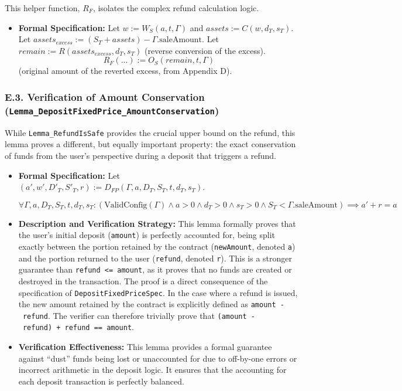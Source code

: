 \documentclass[
  english,
  onecolumn]{article}
\providecommand{\tightlist}{%
  \setlength{\itemsep}{0pt}\setlength{\parskip}{0pt}}
\begin{document}
This helper function, \(R_F\), isolates the complex refund calculation
logic.

\begin{itemize}
\tightlist
\item
  \textbf{Formal Specification:} Let \(w := W_S(a, t, \Gamma)\) and
  \(assets := C(w, d_T, s_T)\). Let
  \(assets_{excess} := (S_T + assets) - \Gamma.\text{saleAmount}\). Let
  \(remain := R(assets_{excess}, d_T, s_T)\) (reverse conversion of the
  excess). \[
  R_F(...) := O_S(remain, t, \Gamma)
  \] (original amount of the reverted excess, from Appendix D).
\end{itemize}

\subsubsection{\texorpdfstring{E.3. Verification of Amount Conservation
(\texttt{Lemma\_DepositFixedPrice\_AmountConservation})}{E.3. Verification of Amount Conservation (Lemma\_DepositFixedPrice\_AmountConservation)}}\label{e.3.-verification-of-amount-conservation-lemma_depositfixedprice_amountconservation}

While \texttt{Lemma\_RefundIsSafe} provides the crucial upper bound on
the refund, this lemma proves a different, but equally important
property: the exact conservation of funds from the user's perspective
during a deposit that triggers a refund.

\begin{itemize}
\item
  \textbf{Formal Specification:} Let
  \((a', w', D'_T, S'_T, r) := D_{FP}(\Gamma, a, D_T, S_T, t, d_T, s_T)\).

  \(\forall \Gamma, a, D_T, S_T, t, d_T, s_T : (\text{ValidConfig}(\Gamma) \land a > 0 \land d_T > 0 \land s_T > 0 \land S_T < \Gamma.\text{saleAmount}) \implies a' + r = a\)
\item
  \textbf{Description and Verification Strategy:} This lemma formally
  proves that the user's initial deposit (\texttt{amount}) is perfectly
  accounted for, being split exactly between the portion retained by the
  contract (\texttt{newAmount}, denoted \texttt{a\textquotesingle{}})
  and the portion returned to the user (\texttt{refund}, denoted
  \texttt{r}). This is a stronger guarantee than
  \texttt{refund\ \textless{}=\ amount}, as it proves that no funds are
  created or destroyed in the transaction. The proof is a direct
  consequence of the specification of \texttt{DepositFixedPriceSpec}. In
  the case where a refund is issued, the new amount retained by the
  contract is explicitly defined as \texttt{amount\ -\ refund}. The
  verifier can therefore trivially prove that
  \texttt{(amount\ -\ refund)\ +\ refund\ ==\ amount}.
\item
  \textbf{Verification Effectiveness:} This lemma provides a formal
  guarantee against ``dust'' funds being lost or unaccounted for due to
  off-by-one errors or incorrect arithmetic in the deposit logic. It
  ensures that the accounting for each deposit transaction is perfectly
  balanced.
\end{itemize}
\end{document}
